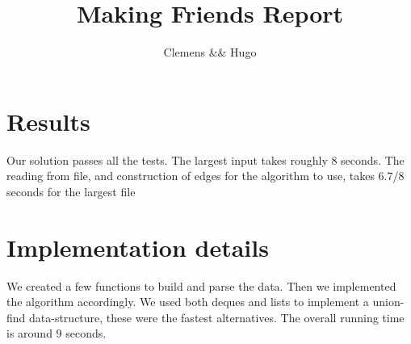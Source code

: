 \documentclass{article}
\title{Making Friends Report}
\author{Clemens && Hugo}
\begin{document}
  \maketitle

  \section{Results}


                Our solution passes all the tests.
                The largest input takes roughly 8 seconds.
                The reading from file, and construction of edges for the algorithm to use, 
                takes 6.7/8 seconds for the largest file

  \section{Implementation details}

                
                We created a few functions to build and parse the data.
                Then we implemented the algorithm accordingly.
                We used both deques and lists to implement a union-find data-structure,
                these were the fastest alternatives.
                The overall running time is around 9 seconds.

  
\end{document}
